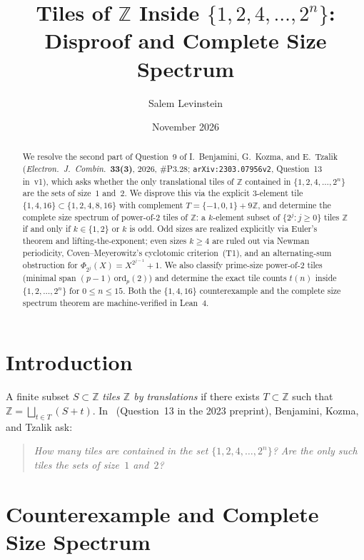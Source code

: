 \documentclass[11pt]{article}
\title{Tiles of $\mathbb{Z}$ Inside $\{1, 2, 4, \dots, 2^n\}$: Disproof and Complete Size Spectrum}
\author{Salem Levinstein}
\date{November 2026}
\begin{document}
\maketitle

\begin{abstract}
We resolve the second part of Question~9 of I.~Benjamini, G.~Kozma, and E.~Tzalik (\emph{Electron.\ J.\ Combin.}\ \textbf{33(3)}, 2026, \#P3.28; \texttt{arXiv:2303.07956v2}, Question~13 in~v1), which asks whether the only translational tiles of $\mathbb{Z}$ contained in $\{1, 2, 4, \dots, 2^n\}$ are the sets of size~$1$ and~$2$. We disprove this via the explicit $3$-element tile $\{1, 4, 16\} \subset \{1, 2, 4, 8, 16\}$ with complement $T = \{-1, 0, 1\} + 9\mathbb{Z}$, and determine the complete size spectrum of power-of-$2$ tiles of $\mathbb{Z}$: a $k$-element subset of $\{2^j : j \ge 0\}$ tiles $\mathbb{Z}$ if and only if $k \in \{1, 2\}$ or $k$ is odd. Odd sizes are realized explicitly via Euler's theorem and lifting-the-exponent; even sizes $k \ge 4$ are ruled out via Newman periodicity, Coven--Meyerowitz's cyclotomic criterion~(T1), and an alternating-sum obstruction for $\Phi_{2^j}(X) = X^{2^{j-1}} + 1$. We also classify prime-size power-of-$2$ tiles (minimal span $(p-1)\,\mathrm{ord}_p(2)$) and determine the exact tile counts $t(n)$ inside $\{1, 2, \dots, 2^n\}$ for $0 \le n \le 15$. Both the $\{1, 4, 16\}$ counterexample and the complete size spectrum theorem are machine-verified in Lean~4.
\end{abstract}

\section{Introduction}

A finite subset $S \subset \mathbb{Z}$ \emph{tiles $\mathbb{Z}$ by translations} if there exists $T \subset \mathbb{Z}$ such that $\mathbb{Z} = \bigsqcup_{t \in T} (S + t)$. In~\cite[Section~3, Question~9]{BKT2026} (Question~13 in the 2023 preprint), Benjamini, Kozma, and Tzalik ask:
\begin{quote}
\emph{How many tiles are contained in the set $\{1, 2, 4, \dots, 2^n\}$? Are the only such tiles the sets of size~$1$ and~$2$?}
\end{quote}

\section{Counterexample and Complete Size Spectrum}
\end{document}
